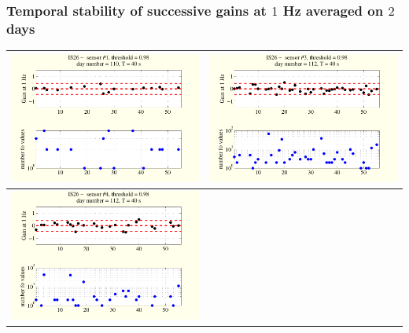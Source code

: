 \documentclass[handout,9pt]{beamer}
\begin{document}
\begin{frame}
\frametitle
{Temporal stability of successive gains at $1$ Hz averaged on $2$ days}
\begin{tabular}{c||c}
\includegraphics[scale=0.3]{evolutionon1atfreq1.pdf}
&
\includegraphics[scale=0.3]{evolutionon3atfreq1.pdf}
\\
\hline\hline
\includegraphics[scale=0.3]{evolutionon4atfreq1.pdf}

\end{tabular}
\end{frame}
\end{document}
